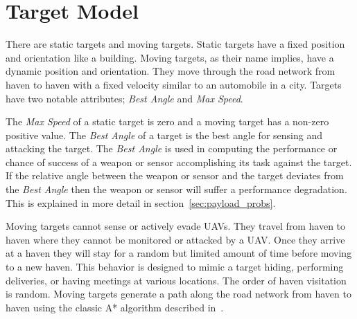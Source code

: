 \chapter{Target Model}
There are static targets and moving targets.  Static targets have a fixed position and orientation like a building.  Moving targets, as their name implies, have a dynamic position and orientation.  They move through the road network from haven to haven with a fixed velocity similar to an automobile in a city.  Targets have two notable attributes; \textit{Best Angle} and \textit{Max Speed}.

The \textit{Max Speed} of a static target is zero and a moving target has a non-zero positive value.  The \textit{Best Angle} of a target is the best angle for sensing and attacking the target.  The \textit{Best Angle} is used in computing the performance or chance of success of a weapon or sensor accomplishing its task against the target.  If the relative angle between the weapon or sensor and the target deviates from the \textit{Best Angle} then the weapon or sensor will suffer a performance degradation.  This is explained in more detail in section~\ref{sec:payload_probs}.



Moving targets cannot sense or actively evade UAVs.  They travel from haven to haven where they cannot be monitored or attacked by a UAV.  Once they arrive at a haven they will stay for a random but limited amount of time before moving to a new haven.  This behavior is designed to mimic a target hiding, performing deliveries, or having meetings at various locations.  The order of haven visitation is random.  Moving targets generate a path along the road network from haven to haven using the classic A* algorithm described in~\cite{wiki:astar}.


